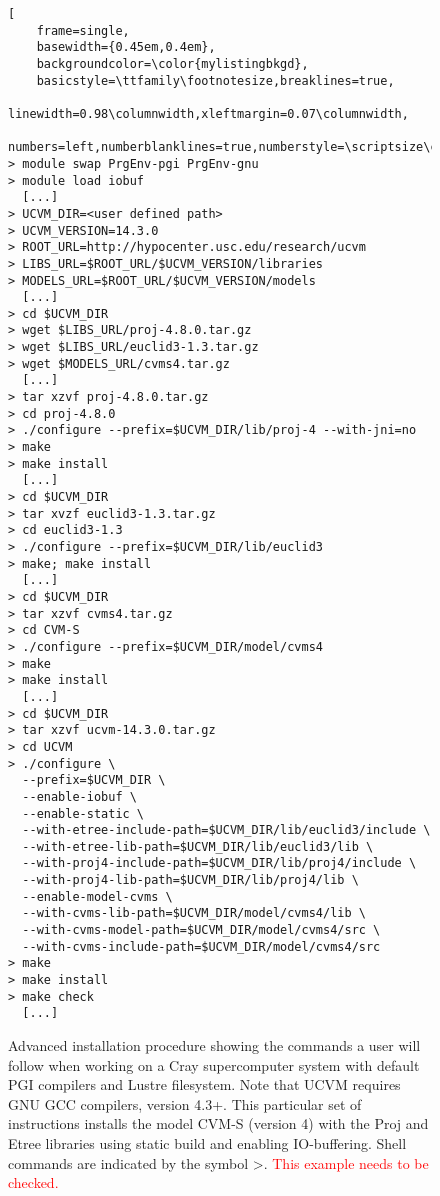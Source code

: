 
\begin{figure}[th]
\centering
\begin{lstlisting}[
	frame=single,
	basewidth={0.45em,0.4em},
	backgroundcolor=\color{mylistingbkgd},
	basicstyle=\ttfamily\footnotesize,breaklines=true,
	linewidth=0.98\columnwidth,xleftmargin=0.07\columnwidth,
	numbers=left,numberblanklines=true,numberstyle=\scriptsize\color{mylistingnclr}]
> module swap PrgEnv-pgi PrgEnv-gnu
> module load iobuf
  [...]
> UCVM_DIR=<user defined path>
> UCVM_VERSION=14.3.0
> ROOT_URL=http://hypocenter.usc.edu/research/ucvm
> LIBS_URL=$ROOT_URL/$UCVM_VERSION/libraries
> MODELS_URL=$ROOT_URL/$UCVM_VERSION/models
  [...]
> cd $UCVM_DIR
> wget $LIBS_URL/proj-4.8.0.tar.gz
> wget $LIBS_URL/euclid3-1.3.tar.gz
> wget $MODELS_URL/cvms4.tar.gz
  [...]
> tar xzvf proj-4.8.0.tar.gz
> cd proj-4.8.0
> ./configure --prefix=$UCVM_DIR/lib/proj-4 --with-jni=no
> make
> make install
  [...]
> cd $UCVM_DIR
> tar xvzf euclid3-1.3.tar.gz
> cd euclid3-1.3
> ./configure --prefix=$UCVM_DIR/lib/euclid3
> make; make install
  [...]
> cd $UCVM_DIR
> tar xzvf cvms4.tar.gz
> cd CVM-S
> ./configure --prefix=$UCVM_DIR/model/cvms4
> make
> make install
  [...]
> cd $UCVM_DIR
> tar xzvf ucvm-14.3.0.tar.gz
> cd UCVM
> ./configure \
  --prefix=$UCVM_DIR \
  --enable-iobuf \
  --enable-static \
  --with-etree-include-path=$UCVM_DIR/lib/euclid3/include \
  --with-etree-lib-path=$UCVM_DIR/lib/euclid3/lib \
  --with-proj4-include-path=$UCVM_DIR/lib/proj4/include \
  --with-proj4-lib-path=$UCVM_DIR/lib/proj4/lib \
  --enable-model-cvms \
  --with-cvms-lib-path=$UCVM_DIR/model/cvms4/lib \
  --with-cvms-model-path=$UCVM_DIR/model/cvms4/src \
  --with-cvms-include-path=$UCVM_DIR/model/cvms4/src
> make
> make install
> make check
  [...]
\end{lstlisting}
\caption{Advanced installation procedure showing the commands a user will follow when working on a Cray supercomputer system with default PGI compilers and Lustre filesystem. Note that UCVM requires GNU GCC compilers, version 4.3+. This particular set of instructions installs the model CVM-S (version 4) with the Proj and Etree libraries using static build and enabling IO-buffering. Shell commands are indicated by the symbol \textgreater. \textcolor{red}{This example needs to be checked.}}
\label{fig:instadvanced}
\end{figure}


